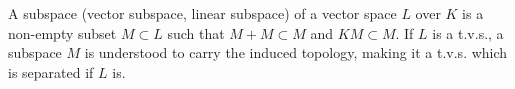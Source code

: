 A subspace (vector subspace, linear subspace) of a vector space $L$ over $K$ is a non-empty subset $M \subset L$ such that $M + M \subset M$ and $KM \subset M$. If $L$ is a t.v.s., a subspace $M$ is understood to carry the induced topology, making it a t.v.s. which is separated if $L$ is.
